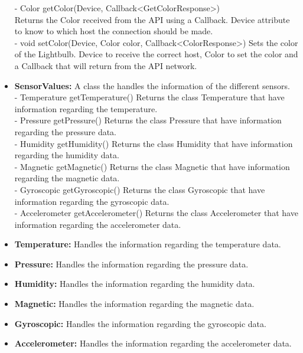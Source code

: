 \documentclass[a4paper]{article}
\begin{document}
\begin{itemize}
        - Color getColor(Device, Callback<GetColorResponse>)\\ Returns the Color received from the API using a Callback. Device attribute to know to which host the connection should be made.\\
        - void setColor(Device, Color color,  Callback<ColorResponse>) Sets the color of the Lightbulb. Device to receive the correct host, Color to set the color and a Callback that will return from the API network.
		\item{\textbf{SensorValues:}} 
		A class the handles the information of the different sensors.\\
        - Temperature getTemperature() Returns the class Temperature that have information regarding the temperature.\\
        - Pressure getPressure() Returns the class Pressure that have information regarding the pressure data.\\
        - Humidity getHumidity() Returns the class Humidity that have information regarding the humidity data.\\
        - Magnetic getMagnetic() Returns the class Magnetic that have information regarding the magnetic data.\\
        - Gyroscopic getGyroscopic() Returns the class Gyroscopic that have information regarding the gyroscopic data.\\
         - Accelerometer getAccelerometer() Returns the class Accelerometer that have information regarding the accelerometer data.
	\item{\textbf{Temperature:}} 
    Handles the information regarding the temperature data.
    \item{\textbf{Pressure:}} 
    Handles the information regarding the pressure data.
    \item{\textbf{Humidity:}} 
    Handles the information regarding the humidity data.
    \item{\textbf{Magnetic:}} 
    Handles the information regarding the magnetic data.
    \item{\textbf{Gyroscopic:}} 
    Handles the information regarding the gyroscopic data.
    \item{\textbf{Accelerometer:}} 
    Handles the information regarding the accelerometer data.
	\end{itemize}
\end{document}
